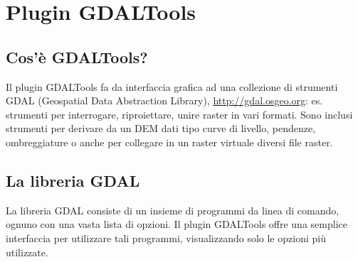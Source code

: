 
\section{Plugin GDALTools}\label{label_plugingdaltools}


\subsection{Cos'è GDALTools?}\label{whatsgdal}
Il plugin GDALTools fa da interfaccia grafica ad una collezione di strumenti GDAL (Geospatial Data Abstraction Library),
\url{http://gdal.osgeo.org}: es. strumenti per interrogare, riproiettare, unire raster in vari formati.
Sono inclusi strumenti per derivare da un DEM dati tipo curve di livello, pendenze, ombreggiature o anche 
per collegare in un raster virtuale diversi file raster.

\subsection{La libreria GDAL}\label{gdal_lib}
La libreria GDAL consiste di un insieme di programmi da linea di comando, ognuno con una vasta lista di opzioni.
Il plugin GDALTools offre una semplice interfaccia per utilizzare tali programmi, visualizzando solo le opzioni più utilizzate.

